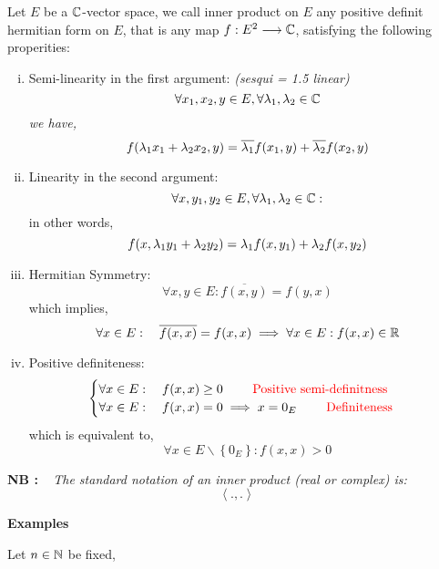 \documentclass{report}
\begin{document}
\begin{definition}
	Let $E $ be a $\mathbb{C}  $-vector space, we call
	inner product on $E $ any positive definit
	hermitian form on $E$, that is any map 
	$ f : E^2  \longrightarrow \mathbb{C}  $, satisfying the following
	properities: 
	\begin{enumerate}[(i)]
	\item Semi-linearity in the first argument: \it (sesqui = 1.5 linear)
		\normalfont
		\[
		\forall x_1,x_2,y \in E, 
		\forall \lambda_1, \lambda_2 \in \mathbb{C}
		\]
		we have, 
		\[
		f(\lambda_1 x_1 + \lambda_2x_2, y)  =
		\overline{\lambda_1} 
		f(x_1, y)  + 
		\overline{\lambda_2}
		f(x_2, y) 
		\]
	\item Linearity in the second argument:
		\[
		\forall x,y_1,y_2 \in  E, 
		\forall \lambda_1, \lambda_2 \in \mathbb{C} :
		\] 
		in other words, 
		\[
		f(x, \lambda_1 y_1 + \lambda_2 y_2)  = 
		\lambda_1 f(x, y_1) + \lambda_2 f(x,y_2) 
		\]
	\item Hermitian Symmetry: 
		\[
		\forall x,y \in  E: 
		\overline{f(x,y) }= 
		f(y,x)  
		\]
		which implies, 
		\[
		\forall x \in  E: \quad 
		\overline{f(x,x) } = f(x,x)  \implies 
		\forall x \in  E: f(x,x) \in \mathbb{R} 
		\] 
	\item Positive definiteness:
	\begin{align*}
	\begin{cases}
	\forall x \in  E: 
	\quad f(x,x) \geq 0 \quad \quad 
	\text{ \textcolor{red}{Positive semi-definitness}}  \\
	\forall x \in  E: \quad 
	f(x,x) = 0 \implies 
	x = 0_{E} \quad 
	\quad \text{ \textcolor{red}{Definiteness}} 
	\end{cases}
	\end{align*}
	which is equivalent to,
	\[
	\forall x \in  E \backslash \left\{ 0_{E} \right\} : 
	f(x,x)  > 0
	\]
	\end{enumerate}
\end{definition}
\divider
\textbf{NB : } ~ \it 
The standard notation of an inner product (real or complex) is: 
\[
\left\langle . , . \right\rangle 
\]
\divider
\begin{center}
	\textbf{Examples} \it 
\end{center}
Let $n \in  \mathbb{N} $ be fixed, 
\end{document}
